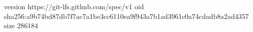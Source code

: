 version https://git-lfs.github.com/spec/v1
oid sha256:a9b74bd87db7f7ac7a1be3cc6110ea9f943a7b1ad3961c0a74cdadb8a2ad4357
size 286184
